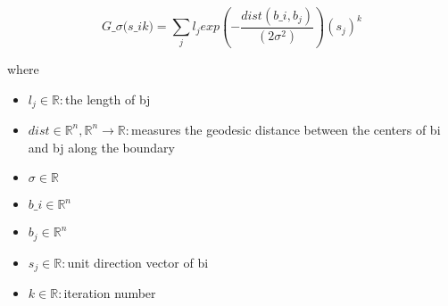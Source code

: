 \documentclass[12pt]{article}
\begin{document}
\[
\textit{G\_σ(s\_i\^k)} = \sum_\textit{j} \textit{l}_{ \textit{j} }exp(-\frac{\textit{dist}(\textit{b\_i},\textit{b}_{ \textit{j} })}{(2\textit{σ}^{2})})(\textit{s}_{ \textit{j} })^{\textit{k}}
\]

where
\begin{itemize}
\item $\textit{l}_{\textit{j}} \in \mathbb{{R}}:$the length of bj
\item $\textit{dist} \in \mathbb{R}^{ \textit{n}},\mathbb{R}^{ \textit{n}}\rightarrow \mathbb{{R}}:$measures the geodesic distance between the centers of bi and bj along the boundary
\item $\textit{σ} \in \mathbb{{R}}$
\item $\textit{b\_i} \in \mathbb{R}^{ \textit{n}}$
\item $\textit{b}_{\textit{j}} \in \mathbb{R}^{ \textit{n}}$
\item $\textit{s}_{\textit{j}} \in \mathbb{{R}}:$unit direction vector of bi
\item $\textit{k} \in \mathbb{{R}}:$iteration number
\end{itemize}
\end{document}
